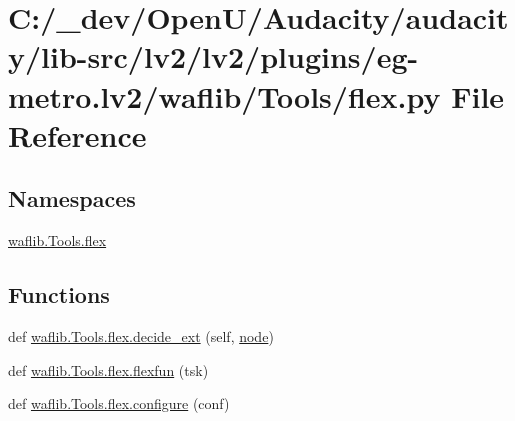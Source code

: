 \hypertarget{lv2_2plugins_2eg-metro_8lv2_2waflib_2_tools_2flex_8py}{}\section{C\+:/\+\_\+dev/\+Open\+U/\+Audacity/audacity/lib-\/src/lv2/lv2/plugins/eg-\/metro.lv2/waflib/\+Tools/flex.py File Reference}
\label{lv2_2plugins_2eg-metro_8lv2_2waflib_2_tools_2flex_8py}
\subsection*{Namespaces}
\begin{DoxyCompactItemize}
\item 
 \hyperlink{namespacewaflib_1_1_tools_1_1flex}{waflib.\+Tools.\+flex}
\end{DoxyCompactItemize}
\subsection*{Functions}
\begin{DoxyCompactItemize}
\item 
def \hyperlink{namespacewaflib_1_1_tools_1_1flex_aac8b14ed3ea22ad22a4ead7f11b8667d}{waflib.\+Tools.\+flex.\+decide\+\_\+ext} (self, \hyperlink{structnode}{node})
\item 
def \hyperlink{namespacewaflib_1_1_tools_1_1flex_aed89723ff6789a05a9e312ca0ddb1acf}{waflib.\+Tools.\+flex.\+flexfun} (tsk)
\item 
def \hyperlink{namespacewaflib_1_1_tools_1_1flex_af98941bb6505104e007e22e2be6da162}{waflib.\+Tools.\+flex.\+configure} (conf)
\end{DoxyCompactItemize}
